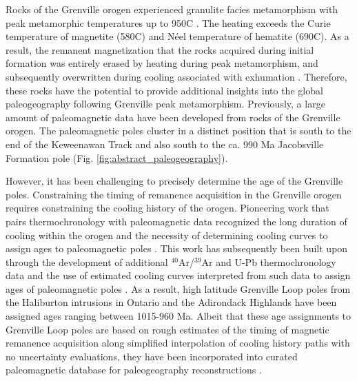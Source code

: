 Rocks of the Grenville orogen experienced granulite facies metamorphism with peak metamorphic temperatures up to 950\textdegree C \citep{Shinevar2021a, Metzger2021a}. The heating exceeds the Curie temperature of magnetite (580\textdegree C) and N\'eel temperature of hematite (690\textdegree C). As a result, the remanent magnetization that the rocks acquired during initial formation was entirely erased by heating during peak metamorphism, and subsequently overwritten during cooling associated with exhumation \citep{McWilliams1975a}. Therefore, these rocks have the potential to provide additional insights into the global paleogeography following Grenville peak metamorphism. Previously, a large amount of paleomagnetic data have been developed from rocks of the Grenville orogen. The paleomagnetic poles cluster in a distinct position that is south to the end of the Keweenawan Track and also south to the ca. 990 Ma Jacobsville Formation pole (Fig. \ref{fig:abstract_paleogeography}). 

However, it has been challenging to precisely determine the age of the Grenville poles. Constraining the timing of remanence acquisition in the Grenville orogen requires constraining the cooling history of the orogen. Pioneering work that pairs thermochronology with paleomagnetic data recognized the long duration of cooling within the orogen and the necessity of determining cooling curves to assign ages to paleomagnetic poles \citep{Berger1979a}. This work has subsequently been built upon through the development of additional $^{40}$Ar/$^{39}$Ar and U-Pb thermochronology data \citep[e.g.][]{Mezger1991a, Warnock2000a} and the use of estimated cooling curves interpreted from such data to assign ages of paleomagnetic poles \citep[e.g.][]{Warnock2000a, Brown2012a}. As a result, high latitude Grenville Loop poles from the Haliburton intrusions in Ontario and the Adirondack Highlands have been assigned ages ranging between 1015-960 Ma. Albeit that these age assignments to Grenville Loop poles are based on rough estimates of the timing of magnetic remanence acquisition along simplified interpolation of cooling history paths with no uncertainty evaluations, they have been incorporated into curated paleomagnetic database for paleogeography reconstructions \cite[e.g.][]{Weil2003a, Evans2021a}.  

